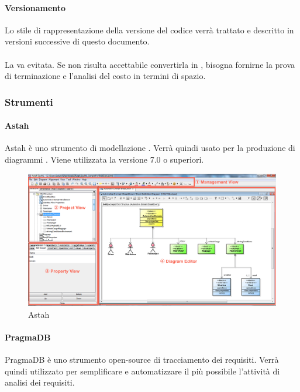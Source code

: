  \paragraph{Versionamento}
 Lo stile di rappresentazione della versione del codice verrà trattato e descritto in versioni successive di questo documento.
 \paragraph{}
 La  va evitata. Se non risulta accettabile convertirla in , bisogna fornirne la prova di terminazione e l'analisi del costo in termini di spazio.
\subsubsection{Strumenti}
  \paragraph{Astah}
  Astah è uno strumento di modellazione . Verrà quindi usato per la produzione di diagrammi . Viene utilizzata la versione 7.0 o superiori.
\begin{figure}[h]
\centering
\includegraphics[scale=0.3]{img/astah.png}
\caption{Astah}\label{sec:Figura1}
\end{figure}
 \paragraph{PragmaDB} 
PragmaDB è uno strumento open-source di tracciamento dei requisiti. Verrà quindi utilizzato per semplificare e automatizzare il più possibile l'attività di analisi dei requisiti.



  
